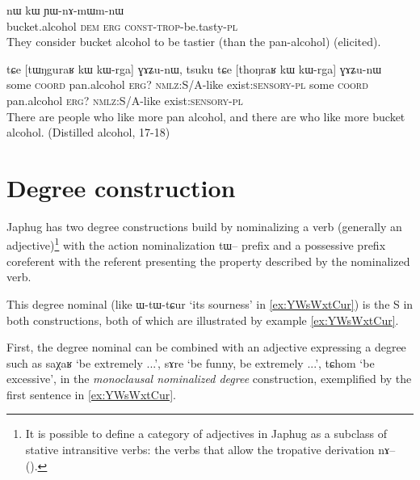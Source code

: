 \documentclass[oldfontcommands,oneside,a4paper,11pt]{article}
\newcommand{\ipa}[1]{{\phon #1}} %
\begin{document}
\begin{exe}
\ex \label{ex:nAmWm}
\gll  \ipa{thoŋraʁ} 	\ipa{nɯ} 	\ipa{kɯ} 	\ipa{ɲɯ-nɤ-mɯm-nɯ} \\
 bucket.alcohol \textsc{dem} \textsc{erg}  \textsc{const-trop}-be.tasty-\textsc{pl} \\
 \glt They consider  bucket alcohol to be tastier (than the pan-alcohol)  (elicited).
\end{exe}

\begin{exe}
\ex \label{ex:kWrga}
\gll \ipa{tsuku}   	\ipa{tɕe}   	 [\ipa{tɯŋguraʁ}   	\ipa{kɯ}   	\ipa{kɯ-rga}]   	\ipa{ɣɤʑu-nɯ,}   		\ipa{tsuku}   	\ipa{tɕe}   	[\ipa{thoŋraʁ}   	\ipa{kɯ}   	\ipa{kɯ-rga}]   	\ipa{ɣɤʑu-nɯ}   \\
some \textsc{coord} pan.alcohol \textsc{erg?} \textsc{nmlz:S/A}-like exist\textsc{:sensory}-\textsc{pl} some \textsc{coord} pan.alcohol \textsc{erg?} \textsc{nmlz:S/A}-like exist\textsc{:sensory}-\textsc{pl} \\
\glt There are people who like more pan alcohol, and there are who like more bucket alcohol. (Distilled alcohol, 17-18)
\end{exe}


%
 
\section{Degree construction} \label{sec:degree}
 
 
Japhug has two degree constructions build by nominalizing a verb (generally an adjective)\footnote{It is possible to define a category of adjectives in Japhug as a subclass of stative intransitive verbs: the verbs that allow the tropative derivation \ipa{nɤ--} (\citealt{jacques13tropative}).}  with the action nominalization \ipa{tɯ--} prefix and a possessive prefix coreferent with the referent presenting the property described by the nominalized verb. 

This degree nominal (like \ipa{ɯ-tɯ-tɕur} `its sourness' in \ref{ex:YWsWxtCur}) is the S in both constructions,  both of which are illustrated by example \ref{ex:YWsWxtCur}. 

First, the degree nominal can be  combined with an adjective expressing a degree such as \ipa{saχaʁ} `be extremely ...', \ipa{sɤre} `be funny, be extremely ...', \ipa{tɕhom} `be excessive', in the \textit{monoclausal nominalized degree} construction, exemplified by the first sentence in \ref{ex:YWsWxtCur}.
\end{document}
